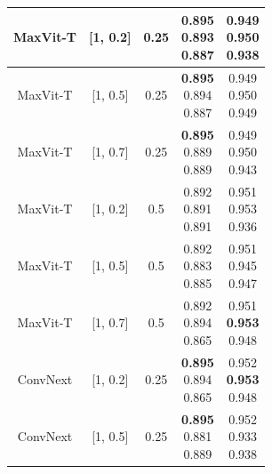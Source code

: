 \documentclass[conference]{IEEEtran}
\begin{document}
\begin{table}[ht]
{\begin{tabular}{||c c c c c||}
     \hline \hline
     MaxVit-T & [1, 0.2] & 0.25 &\multilinecell{\textbf{0.895} \\ 0.893 \\ 0.887} & \multilinecell{0.949 \\ 0.950 \\ 0.938}\\  
     \hline
     MaxVit-T & [1, 0.5] & 0.25 & \multilinecell{\textbf{0.895}  \\ 0.894 \\ 0.887} & \multilinecell{0.949\\ 0.950 \\ 0.949}\\  
     \hline
     MaxVit-T & [1, 0.7] & 0.25 & \multilinecell{\textbf{0.895}  \\ 0.889 \\ 0.889 } & \multilinecell{0.949 \\ 0.950 \\ 0.943}\\  
     \hline
     MaxVit-T & [1, 0.2] & 0.5 & \multilinecell{0.892 \\ 0.891\\ 0.891} & \multilinecell{0.951 \\ 0.953\\ 0.936} \\ 
     \hline
     MaxVit-T & [1, 0.5] & 0.5 & \multilinecell{0.892 \\ 0.883 \\ 0.885 } & \multilinecell{0.951 \\0.945 \\ 0.947}\\  
     \hline
     MaxVit-T& [1, 0.7] & 0.5&  \multilinecell{0.892 \\ 0.894 \\ 0.865 } & \multilinecell{0.951 \\ \textbf{0.953} \\ 0.948}\\  
     \hline \hline
     ConvNext & [1, 0.2] & 0.25 & \multilinecell{\textbf{0.895} \\ 0.894 \\ 0.865 } & \multilinecell{0.952 \\ \textbf{0.953} \\ 0.948}\\   
     \hline
     ConvNext & [1, 0.5] & 0.25 & \multilinecell{\textbf{0.895} \\ 0.881 \\ 0.889 } & \multilinecell{0.952 \\0.933 \\ 0.938}\\ 

\end{tabular}}
\end{table}
\end{document}
